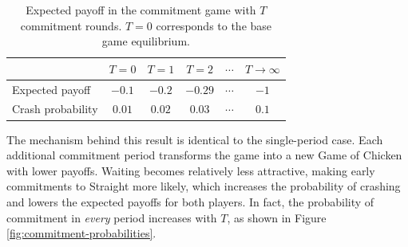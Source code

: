 \documentclass[letterpaper]{article}
\newcommand{\baseMixPayoff}{-0.1}
\newcommand{\TonePayoff}{-0.2}
\newcommand{\TtwoPayoff}{-0.29}
\newcommand{\TinfPayoff}{-1}
\newcommand{\TinfCrashProbability}{0.1}
\newcommand{\baseProbCrash}{0.01}
\newcommand{\ToneProbCrash}{0.02}
\newcommand{\TtwoProbCrash}{0.03}
\theoremstyle{definition}
\begin{document}
\begin{table}[h]
    \centering
    {\small
    \setlength{\tabcolsep}{3pt}
    \begin{tabular}{@{}lccccc@{}}
        \toprule
        & $T = 0$ & $T = 1$ & $T = 2$ & $\cdots$ & $T \to \infty$ \\
        \midrule
        Expected payoff & $\baseMixPayoff$ & $\TonePayoff$ & $\TtwoPayoff$ & $\cdots$ & $\TinfPayoff$ \\[1ex]
        Crash probability & $\baseProbCrash$ & $\ToneProbCrash$ & $\TtwoProbCrash$ & $\cdots$ & $\TinfCrashProbability$ \\
        \bottomrule
    \end{tabular}
    }
    \caption{Expected payoff in the commitment game with $T$ commitment rounds. $T=0$ corresponds to the base game equilibrium.}
    \label{tab:multiple-commitment-periods-chicken}
\end{table}

The mechanism behind this result is identical to the single-period case. Each additional commitment period transforms the game into a new Game of Chicken with lower payoffs. Waiting becomes relatively less attractive, making early commitments to Straight more likely, which increases the probability of crashing and lowers the expected payoffs for both players. In fact, the probability of commitment in \textit{every} period increases with $T$, as shown in Figure \ref{fig:commitment-probabilities}.
\end{document}
